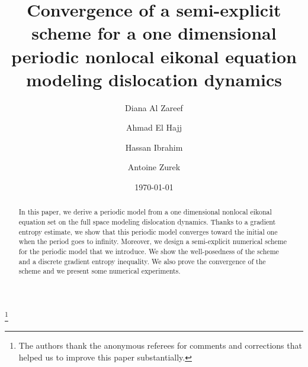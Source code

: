 \documentclass[11pt]{amsart}
\begin{document}
\title[Convergence of a scheme for a periodic nonlocal eikonal equation]{Convergence of a semi-explicit scheme for a one dimensional periodic nonlocal eikonal equation modeling dislocation dynamics}

\author[D. Al Zareef]{Diana Al Zareef}
\address{Universit\'e de Technologie de Compi\`egne, LMAC, 60200 Compi\`egne, France}

\author[A. El Hajj]{Ahmad El Hajj}
\address{Universit\'e de Technologie de Compi\`egne, LMAC, 60200 Compi\`egne, France}

\author[H. Ibrahim]{Hassan Ibrahim}
\address{Faculty of Science I, Mathematics Department, Lebanese University, Hadath, Lebanon}

\author[A. Zurek]{Antoine Zurek}
\address{CNRS – Université de Montréal CRM – CNRS, Montréal, Canada and Universit\'e de Technologie de Compi\`egne, LMAC, 60200 Compi\`egne, France}

\date{\today}

\thanks{The authors thank the anonymous referees for comments and corrections that helped us to improve this paper substantially.} 

\begin{abstract}
In this paper, we derive a periodic model from a one dimensional nonlocal eikonal equation set on the full space modeling dislocation dynamics. Thanks to a gradient entropy estimate, we show that this periodic model converges toward the initial one when the period goes to infinity. Moreover, we design a semi-explicit numerical scheme for the periodic model that we introduce. We show the well-posedness of the scheme and a discrete gradient entropy inequality. We also prove the convergence of the scheme and we present some numerical experiments.
\end{abstract}



\maketitle
\end{document}
